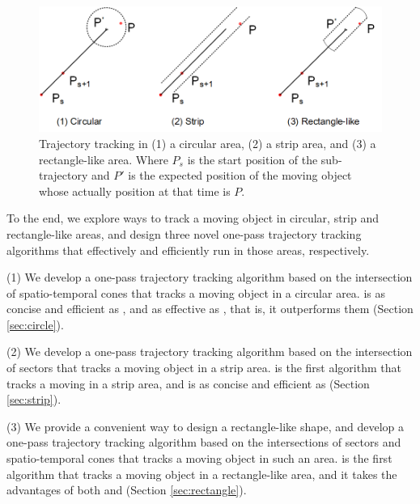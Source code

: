 \begin{figure}[tb!]
	\centering
	\includegraphics[scale=1.0]{Figures/Fig-Areas.png}\vspace{-1ex}
	\vspace{-1ex}
	\caption{\small  Trajectory tracking in (1) a circular area, (2) a strip area, and (3) a rectangle-like area. Where $P_s$ is the start position of the sub-trajectory and $P'$ is the expected position of the moving object whose actually position at that time is $P$.}
	\vspace{-1ex}
	\label{fig:areas}
\end{figure}

To the end, we explore ways to track a moving object in circular, strip and rectangle-like areas, and design three novel one-pass trajectory tracking algorithms that effectively and efficiently run in those areas, respectively. 

\ni (1) We develop a one-pass trajectory tracking algorithm \citt based on the intersection of spatio-temporal cones that tracks a moving object in a circular area. \citt is as concise and efficient as \ldrh, and as effective as \grts, that is, it outperforms them (Section \ref{sec:circle}).

\ni (2) We develop a one-pass trajectory tracking algorithm \sitt based on the intersection of sectors that tracks a moving object in a strip area. \sitt is the first algorithm that tracks a moving in a strip area, and is as concise and efficient as \citt (Section \ref{sec:strip}). %

\ni (3) We provide a convenient way to design a rectangle-like shape, and develop a one-pass trajectory tracking algorithm \bitt based on the intersections of sectors and spatio-temporal cones that tracks a moving object in such an area. \bitt is the first algorithm that tracks a moving object in a rectangle-like area, and it takes the advantages of both \citt and \sitt (Section \ref{sec:rectangle}). 

